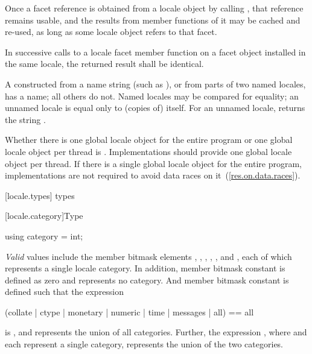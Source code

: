 \pnum
Once a facet reference is obtained from a locale object by calling
,
that reference remains usable, and the results from member functions
of it may be cached and re-used, as long as some locale object refers
to that facet.

\pnum
In successive calls to a locale facet member function on a facet object
installed in the same locale, the returned result shall be identical.

\pnum
A
constructed from a name string (such as ), or from parts of
two named locales, has a name; all others do not.
Named locales may be compared for equality; an unnamed locale is equal
only to (copies of) itself.
For an unnamed locale,
returns the string
.

\pnum
Whether there is one global locale object for the entire program or one global locale
object per thread is .
Implementations should provide one global locale object per
thread. If there is a single global locale object for the entire program,
implementations are not required to avoid data races on it~(\ref{res.on.data.races}).

[locale.types]{ types}


[locale.category]{Type }

%
\begin{itemdecl}
using category = int;
\end{itemdecl}

\pnum
\textit{Valid}
values include the
member bitmask elements
,
,
,
,
,
and
,
each of which represents a single locale category.
In addition,
member bitmask constant
is defined as zero and represents no category. And
member bitmask constant
is defined such that the expression

\begin{codeblock}
(collate | ctype | monetary | numeric | time | messages | all) == all
\end{codeblock}

is
,
and represents the union of all categories.
Further, the expression
,
where
and
each represent a single category, represents the union of the two categories.

